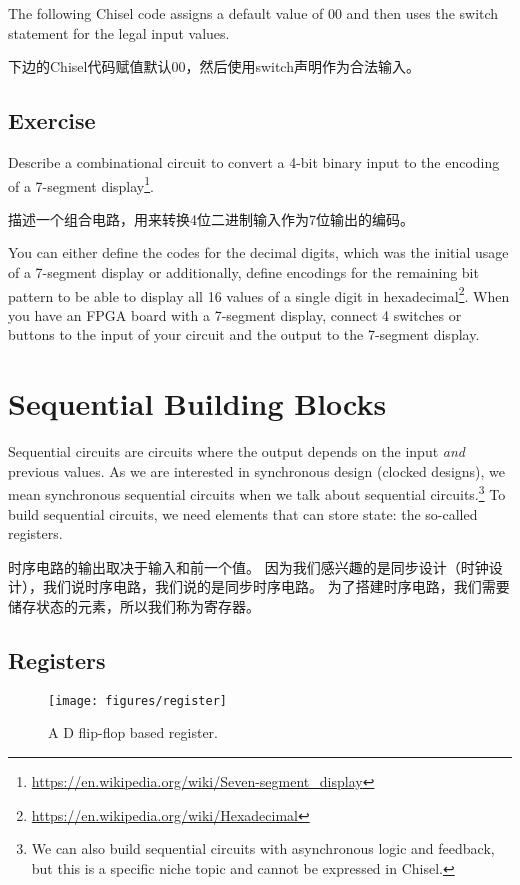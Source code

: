 \documentclass[%
    10pt,
    headinclude, footexclude,
    openright, %
    notitlepage,
    cleardoubleempty,
    headsepline,
    pointlessnumbers,
    bibtotoc, idxtotoc,
    ]{scrbook}
\newcommand{\scale}{0.7}
\newcommand{\myref}[2]{\href{#1}{#2}}
\renewcommand{\myref}[2]{{#2}{\footnote{\url{#1}}}}
\begin{document}
The following Chisel code assigns a default value of 00 and then uses the switch statement
for the legal input values.

下边的Chisel代码赋值默认00，然后使用switch声明作为合法输入。


\section{Exercise}

Describe a combinational circuit to convert a 4-bit binary input to the encoding of a
\myref{https://en.wikipedia.org/wiki/Seven-segment_display}{7-segment display}.

描述一个组合电路，用来转换4位二进制输入作为7位输出的编码。

You can either define the codes for the decimal digits, which was the initial
usage of a 7-segment display or additionally, define encodings for the remaining bit pattern
to be able to display all 16 values of a single digit in
\myref{https://en.wikipedia.org/wiki/Hexadecimal}{hexadecimal}.
When you have an FPGA board with a 7-segment display, connect 4 switches or
buttons to the input of your circuit and the output to the 7-segment display.

\chapter{Sequential Building Blocks}

Sequential circuits are circuits where the output depends on the input \emph{and}
previous values. As we are interested in synchronous design (clocked designs),
we mean synchronous sequential circuits when we talk about sequential
circuits.\footnote{We can also build sequential circuits with asynchronous logic and
feedback, but this is a specific niche topic and cannot be expressed in Chisel.}
To build sequential circuits, we need elements that can store state:
the so-called registers.

时序电路的输出取决于输入和前一个值。
因为我们感兴趣的是同步设计（时钟设计），我们说时序电路，我们说的是同步时序电路。
为了搭建时序电路，我们需要储存状态的元素，所以我们称为寄存器。

\section{Registers}

\begin{figure}
  \centering
  \texttt{[image: figures/register]}
  \caption{A D flip-flop based register.}
  \label{fig:register}
\end{figure}
\end{document}
